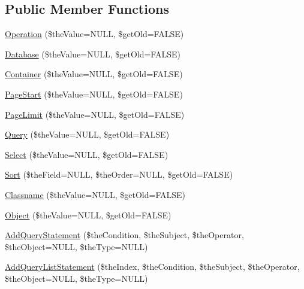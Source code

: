 \subsection*{Public Member Functions}
\begin{DoxyCompactItemize}
\item 
\hyperlink{class_c_data_wrapper_client_ae7cad4809c20d8f2871cfe00da909d67}{Operation} (\$the\-Value=N\-U\-L\-L, \$get\-Old=F\-A\-L\-S\-E)
\item 
\hyperlink{class_c_data_wrapper_client_a4cdd14b07d74eeb834d2a6052902f176}{Database} (\$the\-Value=N\-U\-L\-L, \$get\-Old=F\-A\-L\-S\-E)
\item 
\hyperlink{class_c_data_wrapper_client_a6a696f83f580186da02093327a84fe4f}{Container} (\$the\-Value=N\-U\-L\-L, \$get\-Old=F\-A\-L\-S\-E)
\item 
\hyperlink{class_c_data_wrapper_client_a4d88af5cdfeb4f4592f3ecbe09284594}{Page\-Start} (\$the\-Value=N\-U\-L\-L, \$get\-Old=F\-A\-L\-S\-E)
\item 
\hyperlink{class_c_data_wrapper_client_a77fe02364cc6ebb8c8acc699bb373b98}{Page\-Limit} (\$the\-Value=N\-U\-L\-L, \$get\-Old=F\-A\-L\-S\-E)
\item 
\hyperlink{class_c_data_wrapper_client_a81a5e5f23f729bf167c03e6eee4593ed}{Query} (\$the\-Value=N\-U\-L\-L, \$get\-Old=F\-A\-L\-S\-E)
\item 
\hyperlink{class_c_data_wrapper_client_add9cb305a726062800f13263d9f72031}{Select} (\$the\-Value=N\-U\-L\-L, \$get\-Old=F\-A\-L\-S\-E)
\item 
\hyperlink{class_c_data_wrapper_client_a969efbb268050c30644e955e0a532241}{Sort} (\$the\-Field=N\-U\-L\-L, \$the\-Order=N\-U\-L\-L, \$get\-Old=F\-A\-L\-S\-E)
\item 
\hyperlink{class_c_data_wrapper_client_a6353a8617179b8da4c5dbe76f6247c73}{Classname} (\$the\-Value=N\-U\-L\-L, \$get\-Old=F\-A\-L\-S\-E)
\item 
\hyperlink{class_c_data_wrapper_client_ab5a1dd1e3b56468f2748f9e1ecad92fc}{Object} (\$the\-Value=N\-U\-L\-L, \$get\-Old=F\-A\-L\-S\-E)
\item 
\hyperlink{class_c_data_wrapper_client_a5a4050c5183d5b9ad07216d67b36d638}{Add\-Query\-Statement} (\$the\-Condition, \$the\-Subject, \$the\-Operator, \$the\-Object=N\-U\-L\-L, \$the\-Type=N\-U\-L\-L)
\item 
\hyperlink{class_c_data_wrapper_client_a44e2a7446e4a67d401db9d189eb7a25f}{Add\-Query\-List\-Statement} (\$the\-Index, \$the\-Condition, \$the\-Subject, \$the\-Operator, \$the\-Object=N\-U\-L\-L, \$the\-Type=N\-U\-L\-L)
\end{DoxyCompactItemize}
